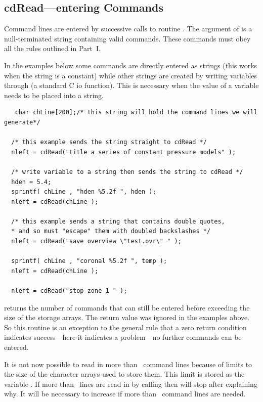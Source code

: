 \subsection{cdRead---entering Commands}

Command lines are entered by successive calls to routine .  The
argument of  is a null-terminated string containing valid commands.
These commands must obey all the rules outlined in Part~I.

In the examples below some commands are directly entered as strings (this
works when the string is a constant) while other strings are created by
writing variables through  (a standard C io function).  This is
necessary when the value of a variable needs to be placed into a string.
\begin{verbatim}
   char chLine[200];/* this string will hold the command lines we will generate*/

  /* this example sends the string straight to cdRead */
  nleft = cdRead("title a series of constant pressure models" );

  /* write variable to a string then sends the string to cdRead */
  hden = 5.4;
  sprintf( chLine , "hden %5.2f ", hden );
  nleft = cdRead(chLine );

  /* this example sends a string that contains double quotes,
  * and so must "escape" them with doubled backslashes */
  nleft = cdRead("save overview \"test.ovr\" " );

  sprintf( chLine , "coronal %5.2f ", temp );
  nleft = cdRead(chLine );

  nleft = cdRead("stop zone 1 " );
\end{verbatim}

 returns the number of commands that can still be entered before
exceeding the size of the storage arrays.
The return value was ignored
in the examples above.
So this routine is an exception to the general rule
that a zero return condition indicates success---here it indicates a
problem---no further commands can be entered.

It is not now possible to read in more than \NKRD\ command lines because
of limits to the size of the character arrays used to store them.  This
limit is stored as the variable .
If more than \NKRD\ lines are read
in by calling  then  will stop after explaining why.
It will
be necessary to increase  if more than \NKRD\ command lines are needed.


